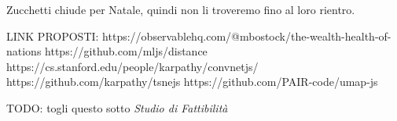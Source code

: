 \documentclass{article}
\begin{document}
Zucchetti chiude per Natale, quindi non li troveremo fino al loro rientro.

LINK PROPOSTI:
https://observablehq.com/@mbostock/the-wealth-health-of-nations
https://github.com/mljs/distance
https://cs.stanford.edu/people/karpathy/convnetjs/
https://github.com/karpathy/tsnejs
https://github.com/PAIR-code/umap-js

TODO: togli questo sotto
\textit{Studio di Fattibilità}
\end{document}
